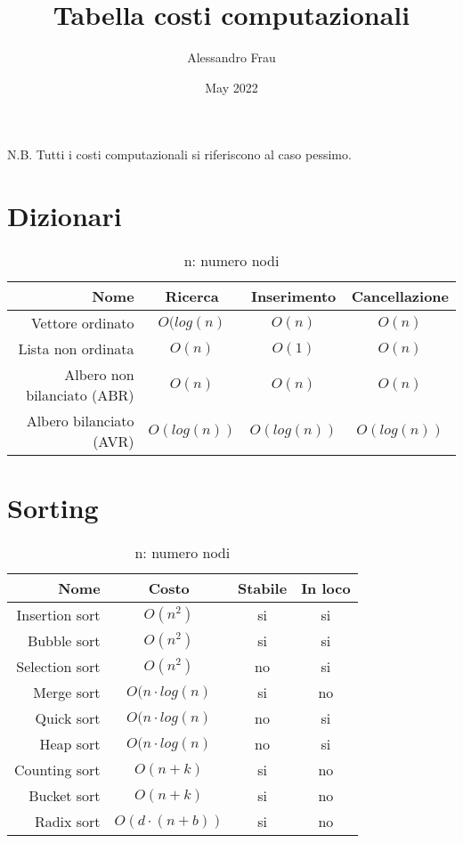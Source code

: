 \documentclass{article}
\title{Tabella costi computazionali}
\author{Alessandro Frau}
\date{May 2022}
\begin{document}
\maketitle
\tableofcontents
N.B. Tutti i costi computazionali si riferiscono al caso pessimo.
\section{Dizionari}
\begin{table}[H]
    \centering
    \def\arraystretch{1.5}
    \begin{tabular}{|r|c|c|c|} \hline
          \textbf{Nome} & \textbf{Ricerca} & \textbf{Inserimento} & \textbf{Cancellazione}\\ \hline
          Vettore ordinato & $O(log(n)$ & $O(n)$ & $O(n)$ \\ \hline
          Lista non ordinata & $O(n)$ & $O(1)$ & $O(n)$ \\ \hline
          Albero non bilanciato (ABR) & $O(n)$ & $O(n)$ & $O(n)$ \\ \hline
          Albero bilanciato (AVR) & $O(log(n))$ & $O(log(n))$ & $O(log(n))$ \\ \hline
    \end{tabular}
    \caption{n: numero nodi}
    \label{tab:my_label}
\end{table}
\newpage
\section{Sorting}
\begin{table}[H]
    \centering
    \def\arraystretch{1.5}
    \begin{tabular}{|r|c|c|c|} \hline
          \textbf{Nome} & \textbf{Costo} & \textbf{Stabile} & \textbf{In loco}\\ \hline
          Insertion sort & $O(n^2)$ & \cellcolor{green}si & \cellcolor{green}si \\ \hline
          Bubble sort & $O(n^2)$ & \cellcolor{green}si & \cellcolor{green}si \\ \hline
          Selection sort & $O(n^2)$ & \cellcolor{red}no & \cellcolor{green}si \\ \hline
          Merge sort & $O(n\cdot log(n)$ & \cellcolor{green}si & \cellcolor{red}no \\ \hline
          Quick sort & $O(n\cdot log(n)$ & \cellcolor{red}no & \cellcolor{green}si \\ \hline
          Heap sort & $O(n\cdot log(n)$ & \cellcolor{red}no & \cellcolor{green}si \\ \hline
          Counting sort & $O(n+k)$ & \cellcolor{green}si & \cellcolor{red}no \\ \hline
          Bucket sort & $O(n+k)$ & \cellcolor{green}si & \cellcolor{red}no \\ \hline
          Radix sort & $O(d \cdot (n+b))$ & \cellcolor{green}si & \cellcolor{red}no \\ \hline
    \end{tabular}
    \caption{n: numero nodi}
    \label{tab:my_label}
\end{table}
\end{document}
